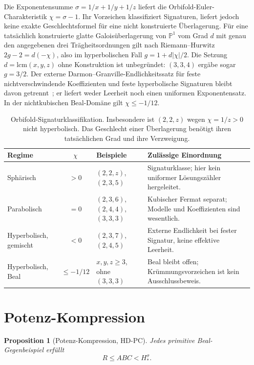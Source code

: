 \documentclass[11pt,a4paper]{article}
\newtheorem{proposition}[theorem]{Proposition}
\begin{document}
Die Exponentensumme $\sigma=1/x+1/y+1/z$ liefert die
Orbifold-Euler-Charakteristik $\chi=\sigma-1$. Ihr Vorzeichen klassifiziert
Signaturen, liefert jedoch keine exakte Geschlechtsformel für eine
nicht konstruierte Überlagerung.
Für eine tatsächlich konstruierte glatte Galoisüberlagerung von
$\mathbb P^1$ vom Grad $d$ mit genau den angegebenen drei Trägheitsordnungen
gilt nach Riemann--Hurwitz $2g-2=d(-\chi)$, also im hyperbolischen Fall
$g=1+d|\chi|/2$. Die Setzung $d=\mathrm{lcm}(x,y,z)$ ohne Konstruktion
ist unbegründet: $(3,3,4)$ ergäbe sogar $g=3/2$.
Der externe Darmon--Granville-Endlichkeitssatz für feste nichtverschwindende
Koeffizienten und feste hyperbolische Signaturen bleibt davon getrennt~\cite{DarmonGranville1995};
er liefert weder Leerheit noch einen uniformen
Exponentensatz. In der nichtkubischen Beal-Domäne gilt $\chi\le-1/12$.
\begin{table}[!htbp]
\centering\small
\begin{tabularx}{\textwidth}{@{}l c >{\raggedright\arraybackslash}p{3.1cm} >{\raggedright\arraybackslash}X@{}}
\toprule
Regime & $\chi$ & Beispiele & Zulässige Einordnung\\
\midrule
Sphärisch & $>0$ & $(2,2,z)$, $(2,3,5)$ & Signaturklasse; hier kein uniformer Lösungszähler hergeleitet.\\
\addlinespace
Parabolisch & $=0$ & $(2,3,6)$, $(2,4,4)$, $(3,3,3)$ & Kubischer Fermat separat; Modelle und Koeffizienten sind wesentlich.\\
\addlinespace
Hyperbolisch, gemischt & $<0$ & $(2,3,7)$, $(2,4,5)$ & Externe Endlichkeit bei fester Signatur, keine effektive Leerheit.\\
\addlinespace
Hyperbolisch, Beal & $\le-1/12$ & $x,y,z\ge3$, ohne $(3,3,3)$ & Beal bleibt offen; Krümmungsvorzeichen ist kein Ausschlussbeweis.\\
\bottomrule
\end{tabularx}
\caption{Orbifold-Signaturklassifikation. Insbesondere ist $(2,2,z)$ wegen $\chi=1/z>0$ nicht hyperbolisch. Das Geschlecht einer Überlagerung benötigt ihren tatsächlichen Grad und ihre Verzweigung.}
\label{tab:regime_matrix}
\end{table}

\section{Potenz-Kompression}

\begin{proposition}[Potenz-Kompression, HD-PC]
\label{prop:compression}
Jedes primitive Beal-Gegenbeispiel erfüllt
\[
  R \le ABC < H_*^{\sigma}.
\]
\end{proposition}
\end{document}
